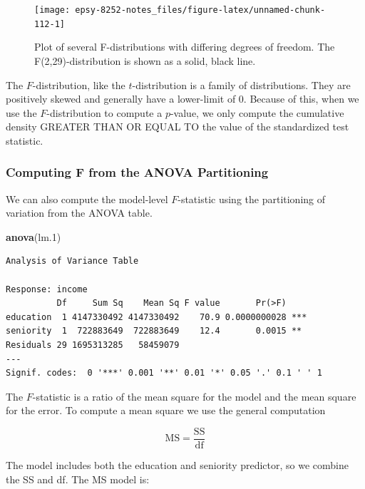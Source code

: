 \documentclass[]{book}
\newenvironment{Shaded}{\begin{snugshade}}{\end{snugshade}}
\newcommand{\FloatTok}[1]{\textcolor[rgb]{0.00,0.00,0.81}{#1}}
\newcommand{\KeywordTok}[1]{\textcolor[rgb]{0.13,0.29,0.53}{\textbf{#1}}}
\newcommand{\NormalTok}[1]{#1}
\begin{document}
\begin{figure}

{\centering \texttt{[image: epsy-8252-notes\_files/figure-latex/unnamed-chunk-112-1]} 

}

\caption{Plot of several F-distributions with differing degrees of freedom. The F(2,29)-distribution is shown as a solid, black line.}\label{fig:unnamed-chunk-112}
\end{figure}

The \(F\)-distribution, like the \(t\)-distribution is a family of distributions. They are positively skewed and generally have a lower-limit of 0. Because of this, when we use the \(F\)-distribution to compute a \(p\)-value, we only compute the cumulative density GREATER THAN OR EQUAL TO the value of the standardized test statistic.

\hypertarget{computing-f-from-the-anova-partitioning}{%
\subsubsection{Computing F from the ANOVA Partitioning}\label{computing-f-from-the-anova-partitioning}}

We can also compute the model-level \(F\)-statistic using the partitioning of variation from the ANOVA table.

\begin{Shaded}
\begin{Highlighting}[]
\KeywordTok{anova}\NormalTok{(lm}\FloatTok{.1}\NormalTok{)}
\end{Highlighting}
\end{Shaded}

\begin{verbatim}
Analysis of Variance Table

Response: income
          Df     Sum Sq    Mean Sq F value       Pr(>F)    
education  1 4147330492 4147330492    70.9 0.0000000028 ***
seniority  1  722883649  722883649    12.4       0.0015 ** 
Residuals 29 1695313285   58459079                         
---
Signif. codes:  0 '***' 0.001 '**' 0.01 '*' 0.05 '.' 0.1 ' ' 1
\end{verbatim}

The \(F\)-statistic is a ratio of the mean square for the model and the mean square for the error. To compute a mean square we use the general computation

\[
\mathrm{MS} = \frac{\mathrm{SS}}{\mathrm{df}}
\]

The model includes both the education and seniority predictor, so we combine the SS and df. The MS model is:
\end{document}

